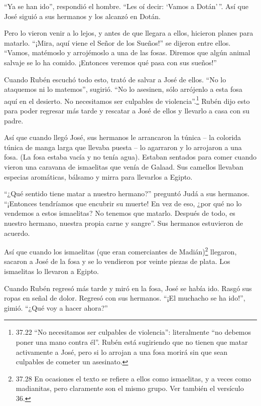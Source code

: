  ``Ya se han ido'', respondió el hombre. ``Les oí decir:
`Vamos a Dotán'\,''. Así que José siguió a sus hermanos y los alcanzó en
Dotán.

 Pero lo vieron venir a lo lejos, y antes de que llegara a
ellos, hicieron planes para matarlo.  ``¡Mira, aquí viene
el Señor de los Sueños!'' se dijeron entre ellos.  ``Vamos,
matémoslo y arrojémoslo a una de las fosas. Diremos que algún animal
salvaje se lo ha comido. ¡Entonces veremos qué pasa con sus sueños!''

 Cuando Rubén escuchó todo esto, trató de salvar a José de
ellos.  ``No lo ataquemos ni lo matemos'', sugirió. ``No lo
asesinen, sólo arrójenlo a esta fosa aquí en el desierto. No necesitamos
ser culpables de violencia''.\footnote{37.22 ``No necesitamos ser
  culpables de violencia'': literalmente ``no debemos poner una mano
  contra él''. Rubén está sugiriendo que no tienen que matar activamente
  a José, pero si lo arrojan a una fosa morirá sin que sean culpables de
  cometer un asesinato.} Rubén dijo esto para poder regresar más tarde y
rescatar a José de ellos y llevarlo a casa con su padre.

 Así que cuando llegó José, sus hermanos le arrancaron la
túnica -- la colorida túnica de manga larga que llevaba puesta --
 lo agarraron y lo arrojaron a una fosa. (La fosa estaba
vacía y no tenía agua).  Estaban sentados para comer cuando
vieron una caravana de ismaelitas que venía de Galaad. Sus camellos
llevaban especias aromáticas, bálsamo y mirra para llevarlos a Egipto.

 ``¿Qué sentido tiene matar a nuestro hermano?'' preguntó
Judá a sus hermanos. ``¡Entonces tendríamos que encubrir su muerte!
 En vez de eso, ¿por qué no lo vendemos a estos ismaelitas?
No tenemos que matarlo. Después de todo, es nuestro hermano, nuestra
propia carne y sangre''. Sus hermanos estuvieron de acuerdo.

 Así que cuando los ismaelitas (que eran comerciantes de
Madián)\footnote{37.28 En ocasiones el texto se refiere a ellos como
  ismaelitas, y a veces como madianitas, pero claramente son el mismo
  grupo. Ver también el versículo 36.} llegaron, sacaron a José de la
fosa y se lo vendieron por veinte piezas de plata. Los ismaelitas lo
llevaron a Egipto.

 Cuando Rubén regresó más tarde y miró en la fosa, José se
había ido. Rasgó sus ropas en señal de dolor.  Regresó con
sus hermanos. ``¡El muchacho se ha ido!'', gimió. ``¿Qué voy a hacer
ahora?''

